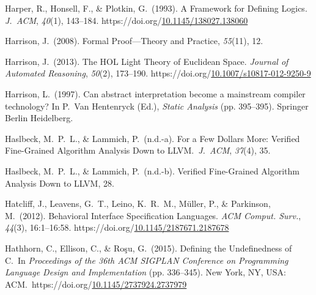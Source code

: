 \documentclass[12pt,twoside]{article}
\begin{document}
{\begin{thebibliography}{1079}
\mdbibitemlabel{}Harper, R., Honsell, F., \& Plotkin, G.~(1993). A Framework for Defining Logics. \emph{J.~ACM}, \emph{40}(1), 143–184. https://doi.org/\href{https://dx.doi.org/10.1145/138027.138060}{10.1145/138027.138060}%

\mdbibitemlabel{}Harrison, J.~(2008). Formal Proof—Theory and Practice, \emph{55}(11), 12.%

\mdbibitemlabel{}Harrison, J.~(2013). The HOL Light Theory of Euclidean Space. \emph{Journal of Automated Reasoning}, \emph{50}(2), 173–190. https://doi.org/\href{https://dx.doi.org/10.1007/s10817-012-9250-9}{10.1007/s10817-012-9250-9}%

\mdbibitemlabel{}Harrison, L.~(1997). Can abstract interpretation become a mainstream compiler technology? In P.~Van Hentenryck (Ed.), \emph{Static Analysis} (pp. 395–395). Springer Berlin Heidelberg.%

\mdbibitemlabel{}Haslbeck, M.~P.~L., \& Lammich, P.~(n.d.-a). For a Few Dollars More: Verified Fine-Grained Algorithm Analysis Down to LLVM.~\emph{J.~ACM}, \emph{37}(4), 35.%

\mdbibitemlabel{}Haslbeck, M.~P.~L., \& Lammich, P.~(n.d.-b). Veriﬁed Fine-Grained Algorithm Analysis Down to LLVM, 28.%

\mdbibitemlabel{}Hatcliff, J., Leavens, G.~T., Leino, K.~R.~M., Müller, P., \& Parkinson, M.~(2012). Behavioral Interface Specification Languages. \emph{ACM Comput. Surv.}, \emph{44}(3), 16:1–16:58. https://doi.org/\href{https://dx.doi.org/10.1145/2187671.2187678}{10.1145/2187671.2187678}%

\mdbibitemlabel{}Hathhorn, C., Ellison, C., \& Roşu, G.~(2015). Defining the Undefinedness of C.~In \emph{Proceedings of the 36th ACM SIGPLAN Conference on Programming Language Design and Implementation} (pp. 336–345). New York, NY, USA: ACM.~https://doi.org/\href{https://dx.doi.org/10.1145/2737924.2737979}{10.1145/2737924.2737979}%


\end{thebibliography}}
\end{document}
